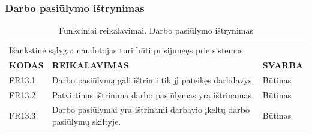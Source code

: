 \documentclass{VUMIFPSkursinis}
\begin{document}
\subsubsection{Darbo pasiūlymo ištrynimas}
\begin{table}[H]
\caption{Funkciniai reikalavimai. Darbo pasiūlymo ištrynimas}
\centering
\normalsize
\begin{tabular}{|p{2cm}|p{10cm}|p{3cm}|}
\hline
\rowcolor{gray!30}
\multicolumn{3}{|l|}{\textbf{13. Darbo pasiūlymo ištrynimas}} \\ \hline
\multicolumn{3}{|l|}{Išankstinė sąlyga: naudotojas turi būti prisijungęs prie sistemos}\\ \hline
\textbf{KODAS}& \multicolumn{1}{m{10cm}|}{\textbf{REIKALAVIMAS}} & \textbf{SVARBA} \\ \hline
FR13.1 & \multicolumn{1}{m{10cm}|}{Darbo pasiūlymą gali ištrinti tik jį pateikęs darbdavys.} & Būtinas \\ \hline
FR13.2 & \multicolumn{1}{m{10cm}|}{Patvirtinus ištrinimą darbo pasiūlymas yra ištrinamas.} & Būtinas \\ \hline
FR13.3 & \multicolumn{1}{m{10cm}|}{Darbo pasiūlymai yra ištrinami  darbavio įkeltų darbo pasiūlymų skiltyje.} & Būtinas \\ \hline
\end{tabular}
\end{table}
\end{document}
